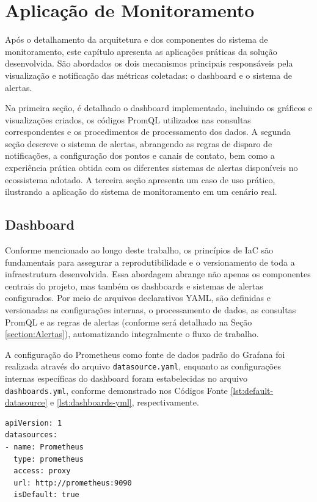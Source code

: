 \chapter{Aplicação de Monitoramento}
\label{chap4}

{\color{red}
Após o detalhamento da arquitetura e dos componentes do sistema de monitoramento, este capítulo apresenta as aplicações práticas da solução desenvolvida. São abordados os dois mecanismos principais responsáveis pela visualização e notificação das métricas coletadas: o dashboard e o sistema de alertas.

Na primeira seção, é detalhado o dashboard implementado, incluindo os gráficos e visualizações criados, os códigos PromQL utilizados nas consultas correspondentes e os procedimentos de processamento dos dados. A segunda seção descreve o sistema de alertas, abrangendo as regras de disparo de notificações, a configuração dos pontos e canais de contato, bem como a experiência prática obtida com os diferentes sistemas de alertas disponíveis no ecossistema adotado. A terceira seção apresenta um caso de uso prático, ilustrando a aplicação do sistema de monitoramento em um cenário real.

\section{Dashboard}
\label{section:Dashboard}

Conforme mencionado ao longo deste trabalho, os princípios de IaC são fundamentais para assegurar a reprodutibilidade e o versionamento de toda a infraestrutura desenvolvida. Essa abordagem abrange não apenas os componentes centrais do projeto, mas também os dashboards e sistemas de alertas configurados. Por meio de arquivos declarativos YAML, são definidas e versionadas as configurações internas, o processamento de dados, as consultas PromQL e as regras de alertas (conforme será detalhado na Seção \ref{section:Alertas}), automatizando integralmente o fluxo de trabalho.

A configuração do Prometheus como fonte de dados padrão do Grafana foi realizada através do arquivo \verb|datasource.yaml|, enquanto as configurações internas específicas do dashboard foram estabelecidas no arquivo \verb|dashboards.yml|, conforme demonstrado nos Códigos Fonte \ref{lst:default-datasource} e \ref{lst:dashboards-yml}, respectivamente.

\begin{lstlisting}[caption={Arquivo datasource.yml}, label={lst:default-datasource}]
apiVersion: 1
datasources:
- name: Prometheus
  type: prometheus
  access: proxy
  url: http://prometheus:9090
  isDefault: true
\end{lstlisting}

}
